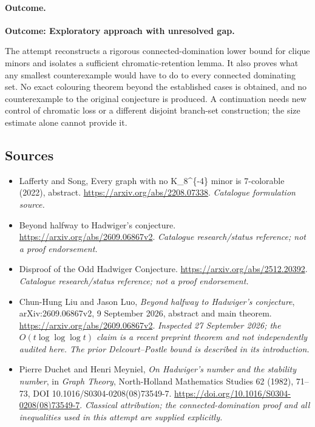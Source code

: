 \documentclass[11pt,a4paper]{article}
\numberwithin{equation}{section}
\begin{document}
\paragraph{Outcome.}
\textbf{Outcome: Exploratory approach with unresolved gap.}

The attempt reconstructs a rigorous connected-domination lower bound for
clique minors and isolates a sufficient chromatic-retention lemma. It also
proves what any smallest counterexample would have to do to every connected
dominating set. No exact colouring theorem beyond the established cases
is obtained, and no counterexample to the original conjecture is produced.
A continuation needs new control of chromatic loss or a different disjoint
branch-set construction; the size estimate alone cannot provide it.
\subsection{Sources}
\begin{itemize}\raggedright
\item[\textnormal{[S1]}]\hypertarget{source:14:1}{} Lafferty and Song, Every graph with no K\_8\textasciicircum{}\{-4\} minor is 7-colorable (2022), abstract.
\url{https://arxiv.org/abs/2208.07338}.
{\small\textit{Catalogue formulation source.}}
\item[\textnormal{[S2]}]\hypertarget{source:14:2}{} Beyond halfway to Hadwiger's conjecture.
\url{https://arxiv.org/abs/2609.06867v2}.
{\small\textit{Catalogue research/status reference; not a proof endorsement.}}
\item[\textnormal{[S3]}]\hypertarget{source:14:3}{} Disproof of the Odd Hadwiger Conjecture.
\url{https://arxiv.org/abs/2512.20392}.
{\small\textit{Catalogue research/status reference; not a proof endorsement.}}
\item[\textnormal{[E1]}]\hypertarget{extra:14:1}{} Chun-Hung Liu and
Jason Luo, \emph{Beyond halfway to Hadwiger's conjecture},
arXiv:2609.06867v2, 9 September 2026, abstract and main theorem.
\url{https://arxiv.org/abs/2609.06867v2}.
{\small\textit{Inspected 27 September 2026; the $O(t\log\log\log t)$
claim is a recent preprint theorem and not independently audited here.
The prior Delcourt--Postle bound is described in its introduction.}}
\item[\textnormal{[E2]}]\hypertarget{extra:14:2}{} Pierre Duchet and
Henri Meyniel, \emph{On Hadwiger's number and the stability number},
in \emph{Graph Theory}, North-Holland Mathematics Studies 62 (1982),
71--73, DOI 10.1016/S0304-0208(08)73549-7.
\url{https://doi.org/10.1016/S0304-0208(08)73549-7}.
{\small\textit{Classical attribution; the connected-domination proof and
all inequalities used in this attempt are supplied explicitly.}}
\end{itemize}
\end{document}

